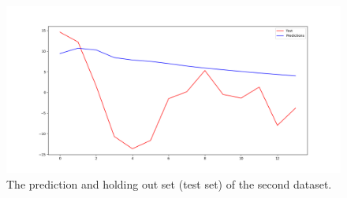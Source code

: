 \begin{figure}[H]
    \centering
    \begin{minipage}[b]{1\textwidth}
        \includegraphics[width=\textwidth]{figures/Ass1/Ass1_D2_AR.png}
    \end{minipage}
    \caption{The prediction and holding out set (test set) of the second dataset. }
    \label{fig:Ass1_D2_AR}
\end{figure}